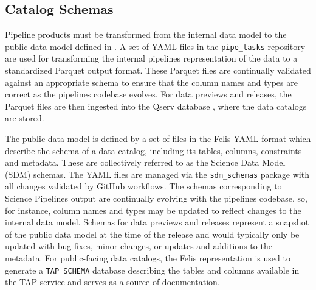 \subsection{Catalog Schemas}
\label{sec:schemas}

Pipeline products must be transformed from the internal data model to the public data model defined in \citet{LSE-163}.
A set of YAML files in the \texttt{pipe\_tasks} repository are used for transforming the internal pipelines representation of the data to a standardized Parquet output format.
These Parquet files are continually validated against an appropriate schema to ensure that the column names and types are correct as the pipelines codebase evolves.
For data previews and releases, the Parquet files are then ingested into the Qserv database \citep{2025ASPC..538..114M}, where the data catalogs are stored.

The public data model is defined by a set of files in the Felis \citep{2024arXiv241209721M} YAML format which describe the schema of a data catalog, including its tables, columns, constraints and metadata.
These are collectively referred to as the Science Data Model (SDM) schemas.
The YAML files are managed via the \texttt{sdm\_schemas} package with all changes validated by GitHub workflows.
The schemas corresponding to Science Pipelines output are continually evolving with the pipelines codebase, so, for instance, column names and types may be updated to reflect changes to the internal data model.
Schemas for data previews and releases represent a snapshot of the public data model at the time of the release and would typically only be updated with bug fixes, minor changes, or updates and additions to the metadata.
For public-facing data catalogs, the Felis representation is used to generate a \texttt{TAP\_SCHEMA} database describing the tables and columns available in the TAP service \citep{2019ivoa.spec.0927D} and serves as a source of documentation.
